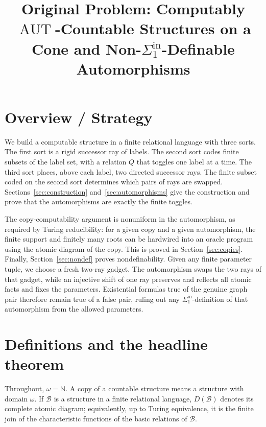 \documentclass[12pt]{article}
\title{Original Problem: Computably \(\operatorname{AUT}\)-Countable Structures on a Cone and Non-\(\Sigma^{\mathrm{in}}_1\)-Definable Automorphisms}
\author{}
\date{}
\theoremstyle{definition}
\theoremstyle{remark}
\begin{document}
\maketitle

\section*{Overview / Strategy}

We build a computable structure in a finite relational language with three sorts.  The first sort is a rigid successor ray of labels.  The second sort codes finite subsets of the label set, with a relation \(Q\) that toggles one label at a time.  The third sort places, above each label, two directed successor rays.  The finite subset coded on the second sort determines which pairs of rays are swapped.  Sections~\ref{sec:construction} and~\ref{sec:automorphisms} give the construction and prove that the automorphisms are exactly the finite toggles.

The copy-computability argument is nonuniform in the automorphism, as required by Turing reducibility: for a given copy and a given automorphism, the finite support and finitely many roots can be hardwired into an oracle program using the atomic diagram of the copy.  This is proved in Section~\ref{sec:copies}.  Finally, Section~\ref{sec:nondef} proves nondefinability.  Given any finite parameter tuple, we choose a fresh two-ray gadget.  The automorphism swaps the two rays of that gadget, while an injective shift of one ray preserves and reflects all atomic facts and fixes the parameters.  Existential formulas true of the genuine graph pair therefore remain true of a false pair, ruling out any \(\Sigma^{\mathrm{in}}_1\)-definition of that automorphism from the allowed parameters.

\section{Definitions and the headline theorem}

Throughout, \(\omega=\mathbb N\).  A copy of a countable structure means a structure with domain \(\omega\).  If \(\mathcal B\) is a structure in a finite relational language, \(D(\mathcal B)\) denotes its complete atomic diagram; equivalently, up to Turing equivalence, it is the finite join of the characteristic functions of the basic relations of \(\mathcal B\).
\end{document}

